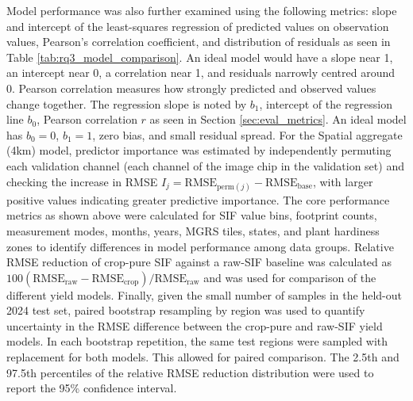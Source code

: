 Model performance was also further examined using the following metrics: slope and intercept of the least-squares regression of predicted values on observation values, Pearson's correlation coefficient, and distribution of residuals as seen in Table \ref{tab:rq3_model_comparison}. An ideal model would have a slope near 1, an intercept near 0, a correlation near 1, and residuals narrowly centred around 0. Pearson correlation measures how strongly predicted and observed values change together. The regression slope is noted by $b_1$, intercept of the regression line  $b_0$, Pearson correlation $r$ as seen in Section \ref{sec:eval_metrics}. An ideal model has $b_0=0$, $b_1=1$, zero bias, and small residual spread. For the Spatial aggregate (4km) model, predictor importance was estimated by independently permuting each validation channel (each channel of the image chip in the validation set) and checking the increase in RMSE $I_j=\mathrm{RMSE}_{\mathrm{perm}(j)}-\mathrm{RMSE}_{\mathrm{base}}$, with larger positive values indicating greater predictive importance. The core performance metrics as shown above were calculated for SIF value bins, footprint counts, measurement modes, months, years, MGRS tiles, states, and plant hardiness zones to identify differences in model performance among data groups. Relative RMSE reduction of crop-pure SIF against a raw-SIF baseline was calculated as $100(\mathrm{RMSE}_{\mathrm{raw}}-\mathrm{RMSE}_{\mathrm{crop}})/\mathrm{RMSE}_{\mathrm{raw}}$ and was used for comparison of the different yield models. Finally, given the small number of samples in the held-out 2024 test set, paired bootstrap resampling by region was used to quantify uncertainty in the RMSE difference between the crop-pure and raw-SIF yield models. In each bootstrap repetition, the same test regions were sampled with replacement for both models. This allowed for paired comparison. The 2.5th and 97.5th percentiles of the relative RMSE reduction distribution were used to report the 95\% confidence interval.

